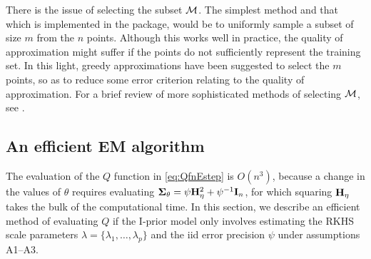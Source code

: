  There is the issue of selecting the subset ${\mathcal M}$.
 The simplest method and that which is implemented in the  package, would be to uniformly sample a subset of size $m$ from the $n$ points.
 Although this works well in practice, the quality of approximation might suffer if the points do not sufficiently represent the training set.
 In this light, greedy approximations have been suggested to select the $m$ points, so as to reduce some error criterion relating to the quality of approximation.
 For a brief review of more sophisticated methods of selecting ${\mathcal M}$, see \citet[§8.1, pp. 173--174]{rasmussen2006gaussian}.


\subsection{An efficient EM algorithm}
\label{sec:efficientEM1}

The evaluation of the $Q$ function in \eqref{eq:QfnEstep} is $O(n^3)$, because a change in the values of $\theta$ requires evaluating ${\bm\Sigma}_\theta = \psi{\mathbf H}_\eta^2 + \psi^{-1}{\mathbf I}_n$, for which squaring ${\mathbf H}_\eta$ takes the bulk of the computational time.
In this section, we describe an efficient method of evaluating $Q$ if the I-prior model only involves estimating the RKHS scale parameters $\lambda = \{\lambda_1,\dots,\lambda_p \}$ and the iid error precision $\psi$ under assumptions A1--A3.

